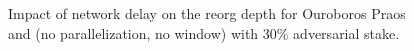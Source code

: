 \begin{figure}[htbp!]
\caption{Impact of network delay on the reorg depth for Ouroboros Praos and \ProjBase (no parallelization, no window) with 30\% adversarial stake.}
\label{fig:delay}
\end{figure}


